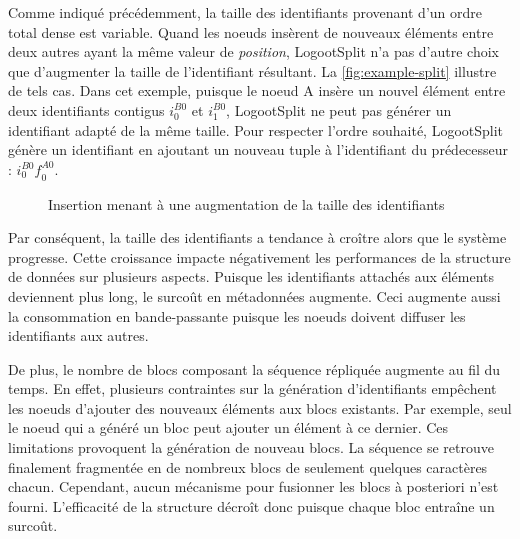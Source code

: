 \documentclass[12pt]{thesul}
\newcommand{\trm}[1]{\mathit{#1}}
\newcommand{\id}[3]{$\trm{#1}^{\trm{#2}}_{\trm{#3}}$}
\newcommand{\widthletter}{2em}
\begin{document}
Comme indiqué précédemment, la taille des identifiants provenant d'un ordre total dense est variable.
Quand les noeuds insèrent de nouveaux éléments entre deux autres ayant la même valeur de \emph{position}, LogootSplit n'a pas d'autre choix que d'augmenter la taille de l'identifiant résultant.
La \autoref{fig:example-split} illustre de tels cas.
Dans cet exemple, puisque le noeud A insère un nouvel élément entre deux identifiants contigus \id{i}{B0}{0} et \id{i}{B0}{1}, LogootSplit ne peut pas générer un identifiant adapté de la même taille.
Pour respecter l'ordre souhaité, LogootSplit génère un identifiant en ajoutant un nouveau tuple à l'identifiant du prédecesseur : \id{i}{B0}{0}\id{f}{A0}{0}.

\begin{figure}[!ht]
  \centering
  \caption{Insertion menant à une augmentation de la taille des identifiants}
  \label{fig:example-split}
\end{figure}

Par conséquent, la taille des identifiants a tendance à croître alors que le système progresse.
Cette croissance impacte négativement les performances de la structure de données sur plusieurs aspects.
Puisque les identifiants attachés aux éléments deviennent plus long, le surcoût en métadonnées augmente.
Ceci augmente aussi la consommation en bande-passante puisque les noeuds doivent diffuser les identifiants aux autres.


De plus, le nombre de blocs composant la séquence répliquée augmente au fil du temps.
En effet, plusieurs contraintes sur la génération d'identifiants empêchent les noeuds d'ajouter des nouveaux éléments aux blocs existants.
Par exemple, seul le noeud qui a généré un bloc peut ajouter un élément à ce dernier.
Ces limitations provoquent la génération de nouveau blocs.
La séquence se retrouve finalement fragmentée en de nombreux blocs de seulement quelques caractères chacun.
Cependant, aucun mécanisme pour fusionner les blocs à posteriori n'est fourni.
L'efficacité de la structure décroît donc puisque chaque bloc entraîne un surcoût.
\end{document}
